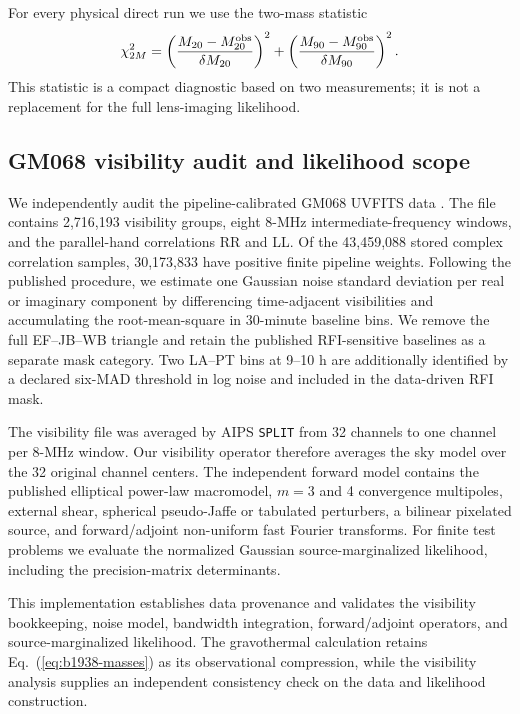 \documentclass[12pt]{iopart}
\begin{document}
For every physical direct run we use the two-mass statistic
\begin{equation}
  \chi^2_{2M}=
  \left(\frac{M_{20}-M_{20}^{\rm obs}}{\delta M_{20}}\right)^2+
  \left(\frac{M_{90}-M_{90}^{\rm obs}}{\delta M_{90}}\right)^2.
  \label{eq:two-mass-chi2}
\end{equation}
This statistic is a compact diagnostic based on two measurements; it is not a
replacement for the full lens-imaging likelihood.

\subsection{GM068 visibility audit and likelihood scope}
\label{sec:visibility-audit-method}

We independently audit the pipeline-calibrated GM068 UVFITS data
\citep{Powell2025}.  The file contains 2,716,193 visibility groups, eight
8-MHz intermediate-frequency windows, and the parallel-hand correlations RR
and LL.  Of the 43,459,088 stored complex correlation samples, 30,173,833
have positive finite pipeline weights.  Following the published procedure,
we estimate one Gaussian noise standard deviation per real or imaginary
component by differencing time-adjacent visibilities and accumulating the
root-mean-square in 30-minute baseline bins.  We remove the full EF--JB--WB
triangle and retain the published RFI-sensitive baselines as a separate mask
category.  Two LA--PT bins at 9--10 h are additionally identified by a
declared six-MAD threshold in log noise and included in the data-driven RFI
mask.

The visibility file was averaged by AIPS \texttt{SPLIT} from 32 channels to one
channel per 8-MHz window.  Our visibility operator therefore averages the sky
model over the 32 original channel centers.  The independent forward model
contains the published elliptical power-law macromodel, $m=3$ and 4
convergence multipoles, external shear, spherical pseudo-Jaffe or tabulated
perturbers, a bilinear pixelated source, and forward/adjoint non-uniform fast
Fourier transforms.  For finite test problems we evaluate the normalized
Gaussian source-marginalized likelihood, including the precision-matrix
determinants.

This implementation establishes data provenance and validates the visibility
bookkeeping, noise model, bandwidth integration, forward/adjoint operators,
and source-marginalized likelihood.  The gravothermal calculation retains
Eq.~(\ref{eq:b1938-masses}) as its observational compression, while the
visibility analysis supplies an independent consistency check on the data and
likelihood construction.
\end{document}
